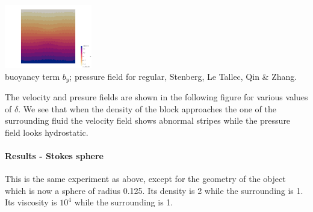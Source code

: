 \begin{center}
\includegraphics[width=3.8cm]{python_codes/fieldstone_78/results/block/full/p3}\\
{\captionfont buoyancy term $b_y$; pressure field for regular, Stenberg, Le Tallec, Qin \& Zhang.} 
\end{center}













The velocity and presure fields are shown in the following figure for various values of $\delta$.
We see that when the density of the block approaches the one of the surrounding fluid the 
velocity field shows abnormal stripes while the pressure field looks hydrostatic.   


\newpage
\paragraph{Results - Stokes sphere}

This is the same experiment as above, except for the geometry of the object 
which is now a sphere of radius 0.125. Its density is 2 while the surrounding is 1.  
Its viscosity is $10^4$ while the surrounding is 1.

